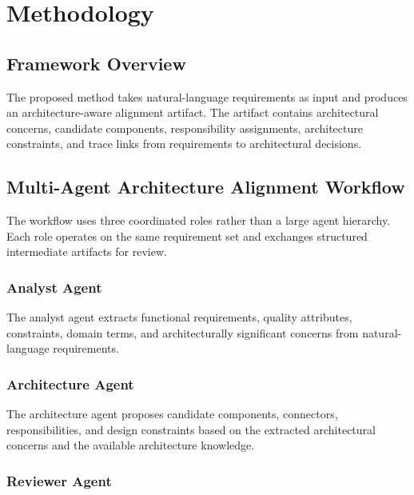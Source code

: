 \section{Methodology}
\label{methodology}

\subsection{Framework Overview}
\label{sec:method-overview}

The proposed method takes natural-language requirements as input and produces an architecture-aware alignment artifact.
The artifact contains architectural concerns, candidate components, responsibility assignments, architecture constraints, and trace links from requirements to architectural decisions.

\subsection{Multi-Agent Architecture Alignment Workflow}
\label{sec:method-workflow}

The workflow uses three coordinated roles rather than a large agent hierarchy.
Each role operates on the same requirement set and exchanges structured intermediate artifacts for review.

\subsubsection{Analyst Agent}
\label{sec:method-analyst-agent}

The analyst agent extracts functional requirements, quality attributes, constraints, domain terms, and architecturally significant concerns from natural-language requirements.

\subsubsection{Architecture Agent}
\label{sec:method-architecture-agent}

The architecture agent proposes candidate components, connectors, responsibilities, and design constraints based on the extracted architectural concerns and the available architecture knowledge.

\subsubsection{Reviewer Agent}
\label{sec:method-reviewer-agent}

